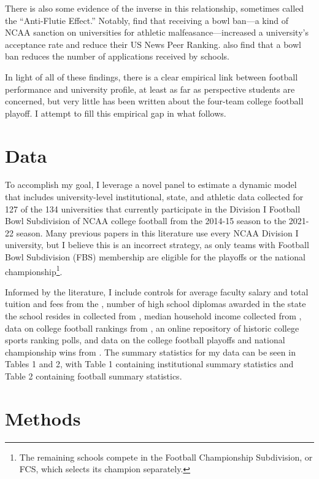 \documentclass[12pt,english]{article}
\begin{document}
There is also some evidence of the inverse in this relationship, sometimes called the ``Anti-Flutie Effect.” Notably, \citet{cormier} find that receiving a bowl ban—a kind of NCAA sanction on universities for athletic malfeasance—increased a university’s acceptance rate and reduce their US News Peer Ranking. \citet{eggers2019} also find that a bowl ban reduces the number of applications received by schools.

In light of all of these findings, there is a clear empirical link between football performance and university profile, at least as far as perspective students are concerned, but very little has been written about the four-team college football playoff. I attempt to fill this empirical gap in what follows. 

\section{Data}

To accomplish my goal, I leverage a novel panel to estimate a dynamic model that includes university-level institutional, state, and athletic data collected for 127 of the 134 universities that currently participate in the Division I Football Bowl Subdivision of NCAA college football from the 2014-15 season to the 2021-22 season. Many previous papers in this literature use every NCAA Division I university, but I believe this is an incorrect strategy, as only teams with Football Bowl Subdivision (FBS) membership are eligible for the playoffs or the national championship\footnote{The remaining schools compete in the Football Championship Subdivision, or FCS, which selects its champion separately.}. 

Informed by the literature, I include controls for average faculty salary and total tuition and fees from the \citet{NCES}, number of high school diplomas awarded in the state the school resides in collected from \citet{NCES}, median household income collected from \citet{fred}, data on college football rankings from \citet{college_poll}, an online repository of historic college sports ranking polls, and data on the college football playoffs and national championship wins from \citet{cfp_history}. The summary statistics for my data can be seen in Tables 1 and 2, with Table 1 containing institutional summary statistics and Table 2 containing football summary statistics. 

\section{Methods}
\end{document}
